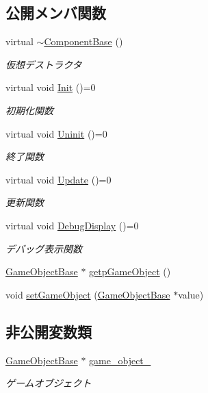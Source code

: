 \subsection*{公開メンバ関数}
\begin{DoxyCompactItemize}
\item 
virtual \mbox{\hyperlink{class_component_base_a5d22c6d5f792ff42ab6cb11a8ac38478}{$\sim$\+Component\+Base}} ()
\begin{DoxyCompactList}\small\item\em 仮想デストラクタ \end{DoxyCompactList}\item 
virtual void \mbox{\hyperlink{class_component_base_a125939d6befe42f28886a6523e86b18b}{Init}} ()=0
\begin{DoxyCompactList}\small\item\em 初期化関数 \end{DoxyCompactList}\item 
virtual void \mbox{\hyperlink{class_component_base_a9f42beaf0383d6f629819579cab4de57}{Uninit}} ()=0
\begin{DoxyCompactList}\small\item\em 終了関数 \end{DoxyCompactList}\item 
virtual void \mbox{\hyperlink{class_component_base_a58e66d65bc8f3cd5ab67b4b2deab4fc2}{Update}} ()=0
\begin{DoxyCompactList}\small\item\em 更新関数 \end{DoxyCompactList}\item 
virtual void \mbox{\hyperlink{class_component_base_a36ae7d27ad9d756fa245bad443020407}{Debug\+Display}} ()=0
\begin{DoxyCompactList}\small\item\em デバッグ表示関数 \end{DoxyCompactList}\item 
\mbox{\hyperlink{class_game_object_base}{Game\+Object\+Base}} $\ast$ \mbox{\hyperlink{class_component_base_a558f69e072f0dfedaf9416cf1a903db5}{getp\+Game\+Object}} ()
\item 
void \mbox{\hyperlink{class_component_base_ae671317076d3c89ba0793ae2cd34d5ea}{set\+Game\+Object}} (\mbox{\hyperlink{class_game_object_base}{Game\+Object\+Base}} $\ast$value)
\end{DoxyCompactItemize}
\subsection*{非公開変数類}
\begin{DoxyCompactItemize}
\item 
\mbox{\hyperlink{class_game_object_base}{Game\+Object\+Base}} $\ast$ \mbox{\hyperlink{class_component_base_a60a43b42437cd5be2b05d2f4f4dd8147}{game\+\_\+object\+\_\+}}
\begin{DoxyCompactList}\small\item\em ゲームオブジェクト \end{DoxyCompactList}\end{DoxyCompactItemize}


